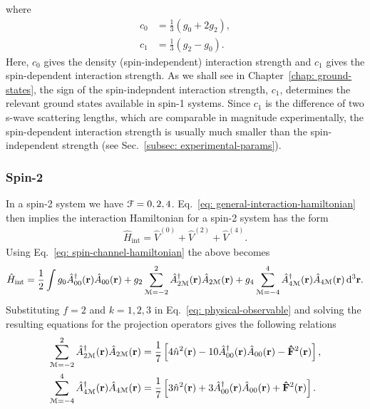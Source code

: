 where
\begin{align}
    c_0 &= \frac{1}{3}\left(g_0 + 2g_2\right), \\
    c_1 &= \frac{1}{3}\left(g_2 - g_0\right).
\end{align}
Here, \(c_0\) gives the density (spin-independent) interaction strength and
\(c_1\) gives the spin-dependent interaction strength.
As we shall see in Chapter~\ref{chap: ground-states}, the sign of the
spin-indepndent interaction strength, \(c_1\), determines the relevant ground
states available in spin-1 systems.
Since \(c_1\) is the difference of two s-wave scattering lengths, which are
comparable in magnitude experimentally, the spin-dependent interaction strength
is usually much smaller than the spin-independent strength (see
Sec.~\ref{subsec: experimental-params}).

\subsubsection{Spin-2}
In a spin-2 system we have \(\EuScript{F}=0,2,4\).
Eq.~\eqref{eq: general-interaction-hamiltonian} then implies the interaction
Hamiltonian for a spin-2 system has the form
\begin{align}
    \hat{H}_\text{int} = \hat{V}^{(0)} + \hat{V}^{(2)} + \hat{V}^{(4)}.
\end{align}
Using Eq.~\eqref{eq: spin-channel-hamiltonian} the above becomes
\begin{align}\label{eq: spin-2-interaction-hamiltonian-projection}
    \hat{H}_\text{int} = \frac{1}{2}\int
        g_0\hat{A}^\dagger_{00}(\vb{r})\hat{A}_{00}(\vb{r})
        + g_2\sum_{\EuScript{M}=-2}^{2}
        \hat{A}^\dagger_{2\EuScript{M}}(\vb{r})\hat{A}_{2\EuScript{M}}(\vb{r})
        + g_4\sum_{\EuScript{M}=-4}^{4}
        \hat{A}^\dagger_{4\EuScript{M}}(\vb{r})\hat{A}_{4\EuScript{M}}(\vb{r})
        \, \dd^3\vb{r}.
\end{align}
Substituting \(f=2\) and \(k=1,2,3\) in Eq.~\eqref{eq: physical-observable}
and solving the resulting equations for the projection operators gives the
following relations
\begin{align}
    \sum_{\EuScript{M}=-2}^{2}
    \hat{A}^\dagger_{2\EuScript{M}}(\vb{r})\hat{A}_{2\EuScript{M}}(\vb{r}) &=
    \frac{1}{7}\left[4\hat{n}^2(\vb{r})
        - 10\hat{A}^\dagger_{00}(\vb{r})\hat{A}_{00}(\vb{r})
        - \vb{\hat{F}}^2(\vb{r})\right], \\
    \sum_{\EuScript{M}=-4}^{4}
    \hat{A}^\dagger_{4\EuScript{M}}(\vb{r})\hat{A}_{4\EuScript{M}}(\vb{r}) &=
    \frac{1}{7}\left[3\hat{n}^2(\vb{r})
        + 3\hat{A}^\dagger_{00}(\vb{r})\hat{A}_{00}(\vb{r})
        + \vb{\hat{F}}^2(\vb{r})\right].
\end{align}
